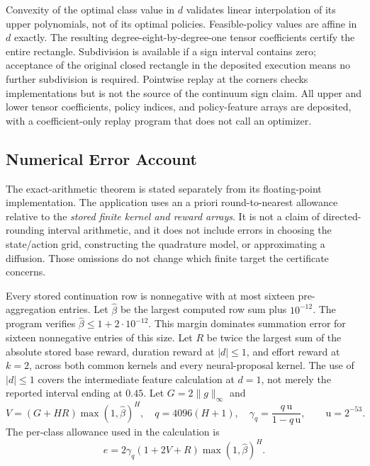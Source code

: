 Convexity of the optimal class value in $d$ validates linear interpolation of its upper polynomials, not of its optimal policies. Feasible-policy values are affine in $d$ exactly. The resulting degree-eight-by-degree-one tensor coefficients certify the entire rectangle. Subdivision is available if a sign interval contains zero; acceptance of the original closed rectangle in the deposited execution means no further subdivision is required. Pointwise replay at the corners checks implementations but is not the source of the continuum sign claim. All upper and lower tensor coefficients, policy indices, and policy-feature arrays are deposited, with a coefficient-only replay program that does not call an optimizer.

\subsection{Numerical Error Account}
The exact-arithmetic theorem is stated separately from its floating-point implementation. The application uses an a priori round-to-nearest allowance relative to the \emph{stored finite kernel and reward arrays}. It is not a claim of directed-rounding interval arithmetic, and it does not include errors in choosing the state/action grid, constructing the quadrature model, or approximating a diffusion. Those omissions do not change which finite target the certificate concerns.

Every stored continuation row is nonnegative with at most sixteen pre-aggregation entries. Let $\widehat\beta$ be the largest computed row sum plus $10^{-12}$. The program verifies $\widehat\beta\leq1+2\cdot10^{-12}$. This margin dominates summation error for sixteen nonnegative entries of this size. Let $R$ be twice the largest sum of the absolute stored base reward, duration reward at $|d|\leq1$, and effort reward at $k=2$, across both common kernels and every neural-proposal kernel. The use of $|d|\leq1$ covers the intermediate feature calculation at $d=1$, not merely the reported interval ending at $0.45$. Let $G=2\|g\|_\infty$ and
\[
 V=(G+HR)\max(1,\widehat\beta)^H,\quad
 q=4096(H+1),\quad \gamma_q=\frac{q\,\mathrm u}{1-q\,\mathrm u},
 \qquad \mathrm u=2^{-53}.
\]
The per-class allowance used in the calculation is
\begin{equation}
 e=2\gamma_q(1+2V+R)\max(1,\widehat\beta)^H.
 \label{eq:r7_roundoff}
\end{equation}

